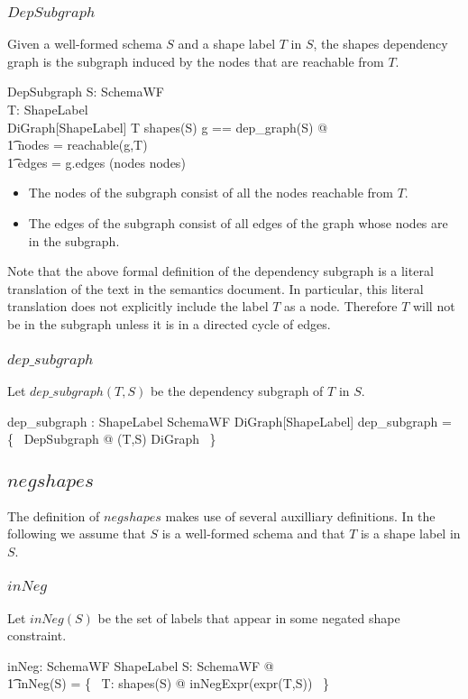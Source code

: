 \documentclass{article}
\begin{document}
\subsubsection{$DepSubgraph$}
Given a well-formed schema $S$ and a shape label $T$ in $S$, the shapes dependency
graph is the subgraph induced by the nodes that are reachable from $T$.
\begin{schema}{DepSubgraph}
	S: SchemaWF \\
	T: ShapeLabel \\
	DiGraph[ShapeLabel]
\where
	T \in shapes(S)
\also
	\LET g == dep\_graph(S) @ \\
\t1		nodes = reachable(g,T) \land \\
\t1		edges = g.edges \cap (nodes \cross nodes)
\end{schema}
\begin{itemize}
\item The nodes of the subgraph consist of all the nodes reachable from $T$.
\item The edges of the subgraph consist of all edges of the graph whose nodes are in the subgraph.
\end{itemize}

Note that the above formal definition of the dependency subgraph is a literal translation of the text in the semantics document.
In particular, this literal translation does not explicitly include the label $T$ as a node.
Therefore $T$ will not be in the subgraph unless it is in a directed cycle of edges.

\subsubsection{$dep\_subgraph$}
Let $dep\_subgraph(T,S)$ be the dependency subgraph of $T$ in $S$.
\begin{axdef}
	dep\_subgraph : ShapeLabel \cross SchemaWF \pfun DiGraph[ShapeLabel]
\where
	dep\_subgraph = \{~ DepSubgraph @ (T,S) \mapsto \theta DiGraph ~\}
\end{axdef}

\subsection{$negshapes$}
The definition of $negshapes$ makes use of several auxilliary definitions. 
In the following we assume that $S$ is a well-formed schema and that $T$ is a shape label in $S$.

\subsubsection{$inNeg$}
Let $inNeg(S)$ be the set of labels that appear in some negated shape constraint.
\begin{axdef}
	inNeg: SchemaWF \fun \finset ShapeLabel
\where
	\forall S: SchemaWF @ \\
\t1		inNeg(S) = \bigcup \{~ T: shapes(S) @ inNegExpr(expr(T,S)) ~\}
\end{axdef}
\end{document}
